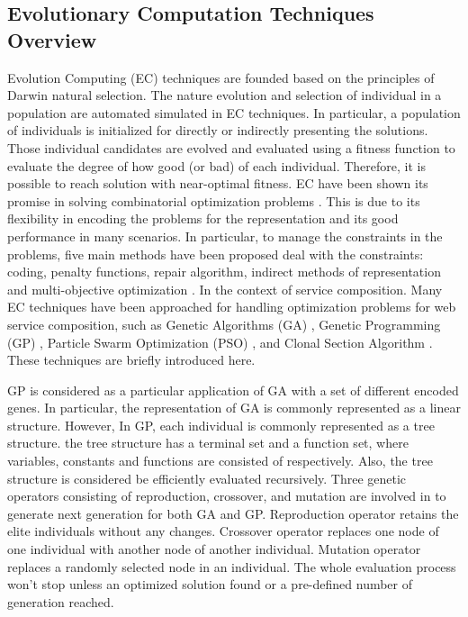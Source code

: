 \subsection{Evolutionary Computation Techniques Overview}\label{ec}

Evolution Computing (EC) techniques are founded based on the principles of Darwin natural selection. The nature evolution and selection of individual in a population are automated simulated in EC techniques. In particular, a population of individuals is initialized for directly or indirectly presenting the solutions. Those individual candidates are evolved and evaluated using a fitness function to evaluate the degree of how good (or bad) of each individual. Therefore, it is possible to reach solution with near-optimal fitness. EC have been shown its promise in solving combinatorial optimization problems \cite{back1997evolutionary}. This is due to its flexibility in encoding the problems for the representation and its good performance in many scenarios. In particular, to manage the constraints in the problems, five main methods have been proposed deal with the constraints: coding, penalty functions, repair algorithm, indirect methods of representation and multi-objective optimization \cite{fleming2002evolutionary}. In the context of service composition. Many EC techniques have been approached for handling optimization problems for web service composition, such as Genetic Algorithms (GA) \cite{whitley1994genetic}, Genetic Programming (GP) \cite{koza1992genetic}, Particle Swarm Optimization (PSO) \cite{kennedy1995particle}, and Clonal Section Algorithm \cite{de2002learning}. These techniques are briefly introduced here.

GP is considered as a particular application of GA with a set of different encoded genes. In particular, the representation of GA is commonly represented as a linear structure. However, In GP, each individual is commonly represented as a tree structure. the tree structure has a terminal set and a function set, where variables, constants and functions are consisted of respectively. Also,  the tree structure is considered be efficiently evaluated recursively. Three genetic operators consisting of reproduction, crossover, and mutation are involved in to generate next generation for both GA and GP. Reproduction operator retains the elite individuals without any changes. Crossover operator replaces one node of one individual with another node of another individual. Mutation operator replaces a randomly selected node in an individual. The whole evaluation process won't stop unless an optimized solution found or a pre-defined number of generation reached.


